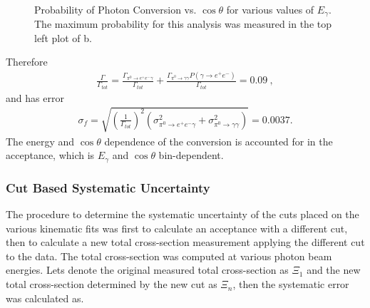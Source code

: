 \begin{figure}[h!]\begin{center}
\\
\caption[Probability of Photon Conversion vs. $\cos\theta$ for various values of $E_\gamma$]{\label{fig:convprob_all}Probability of Photon Conversion vs. $\cos\theta$ for various values of $E_\gamma$. The maximum probability for this analysis was measured in the top left plot of b.}
\end{center}\end{figure}
Therefore
\begin{align}
 \frac{\Gamma}{\Gamma_{tot}} = \frac{\Gamma_{\pi^{0}\rightarrow e^{+}e^{-}\gamma}}{\Gamma_{tot}} + \frac{\Gamma_{\pi^{0}\rightarrow \gamma \gamma}P(\gamma \to  e^{+}e^{-})}{\Gamma_{tot}} = 0.09 \ ,
\end{align}
and has error
\begin{align}
\sigma_f = \sqrt{\left(\frac{1}{\Gamma_{tot}}\right)^2(\sigma^2_{\pi^{0}\rightarrow e^{+}e^{-}\gamma} + \sigma^2_{\pi^{0}\rightarrow \gamma \gamma})  } = 0.0037.  
\end{align}
The energy and $\cos \theta$ dependence of the conversion is accounted for in the acceptance, which is $E_\gamma$ and $\cos \theta$ bin-dependent. 


\FloatBarrier

\subsubsection{Cut Based Systematic Uncertainty}
The procedure to determine the systematic uncertainty of the cuts placed on the various kinematic fits was first to calculate an acceptance with a different cut, then to calculate a new total cross-section measurement applying the different cut to the data. The total cross-section was computed at various photon beam energies. Lets denote the original measured total cross-section as $\Xi_1$ and the new total cross-section determined by the new cut as $\Xi_n$, then the systematic error was calculated as.


